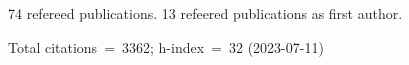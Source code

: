 74 refereed publications. 13 refeered publications as first author.

Total citations~=~3362; h-index~=~32 (2023-07-11)